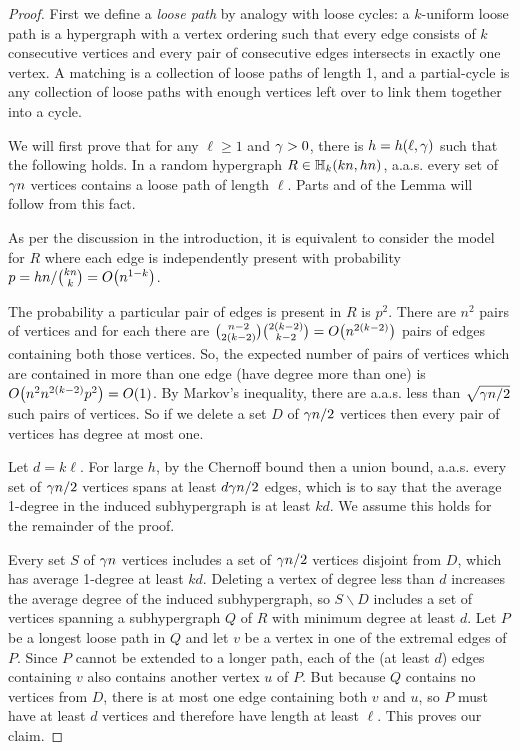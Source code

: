 \documentclass[11pt,english]{article}
\theoremstyle{plain}
\theoremstyle{definition}
\theoremstyle{definition}
\theoremstyle{plain}
\theoremstyle{plain}
\theoremstyle{plain}
\theoremstyle{plain}
\theoremstyle{remark}
\theoremstyle{remark}
\let\originalleft\left
\let\originalright\right
\renewcommand{\left}{\mathopen{}\mathclose\bgroup\originalleft}
\renewcommand{\right}{\aftergroup\egroup\originalright}
\begin{document}
\begin{proof}
First we define a \emph{loose path} by analogy with loose cycles:
a $k$-uniform loose path is a hypergraph with a vertex ordering such
that every edge consists of $k$ consecutive vertices and every pair
of consecutive edges intersects in exactly one vertex. A matching
is a collection of loose paths of length 1, and a partial-cycle is any
collection of loose paths with enough vertices left over to link them
together into a cycle.

We will first prove that for any $\ell\ge1$ and $\gamma>0$, there
is $h=h\left(\ell,\patheps\right)$ such that the following holds. In a
random hypergraph $R\in\HH_{k}\left(kn,hn\right)$,
a.a.s. every set of $\gamma n$ vertices contains a loose path of length
$\ell$. Parts  and  of the Lemma will follow from this fact.

As per the discussion in the introduction, it is equivalent to consider
the model for $R$ where each edge is independently present with probability
$p=hn/{kn \choose k}=O\left(n^{1-k}\right)$.

The probability a particular pair of edges is present in $R$ is $p^2$. There are $n^2$ pairs of vertices and for each there are $
{n-2\choose 2\left(k-2\right)}{2\left(k-2\right) \choose k-2}=
O\left(n^{2\left(k-2\right)}\right)$ pairs of edges containing both those vertices. So, the expected number of pairs of vertices
which are contained in more than one edge (have degree more than one)
is $O\left(n^2n^{2\left(k-2\right)}p^2\right)=O\left(1\right)$. By Markov's inequality, there are a.a.s. less
than $\sqrt{\gamma n/2}$ such pairs of vertices. So if we delete a
set $D$ of $\gamma n/2$ vertices then every pair of vertices has
degree at most one.

Let $d=k\ell$. For
large $h$, by the Chernoff bound then a union
bound, a.a.s. every set of $\gamma n/2$ vertices spans at least $d\gamma n/2$
edges, which is to say that the average 1-degree in the induced subhypergraph
is at least $kd$. We assume this holds for the remainder of the proof.

Every set $S$ of $\gamma n$ vertices includes a set of $\gamma n/2$
vertices disjoint from $D$, which has average 1-degree at least $kd$.
Deleting a vertex of degree less than $d$ increases the average degree
of the induced subhypergraph, so $S\backslash D$ includes a set of
vertices spanning a subhypergraph $Q$ of $R$ with minimum degree
at least $d$. Let $P$ be a longest loose path in $Q$ and let $v$
be a vertex in one of the extremal edges of $P$. Since $P$ cannot
be extended to a longer path, each of the (at least $d$) edges containing
$v$ also contains another vertex $u$ of $P$. But because $Q$ contains
no vertices from $D$, there is at most
one edge containing both $v$ and $u$, so $P$ must have at least
$d$ vertices and therefore have length at least $\ell$. This proves
our claim.


\end{proof}
\end{document}
